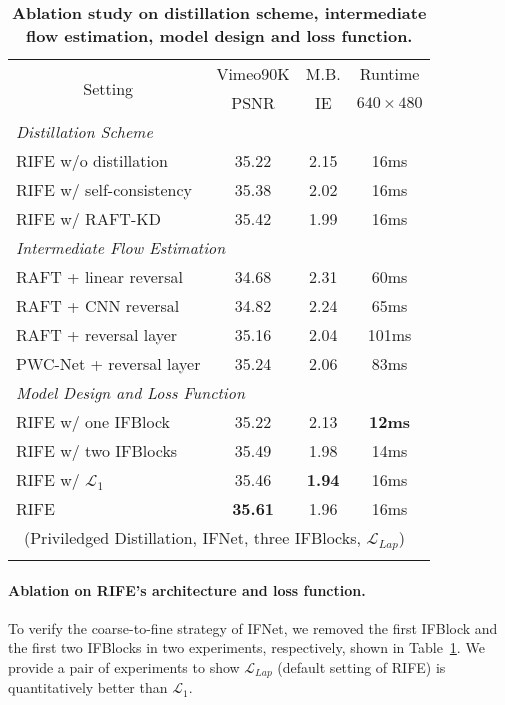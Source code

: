 \documentclass[final]{cvpr}
\def\red#1{\textcolor{MyRed}{#1}}
\def\first#1{\red{\textbf{#1}}}
\begin{document}
\begin{table}[t]
	\caption{\textbf{Ablation study on distillation scheme, intermediate flow estimation, model design and loss function.}}
	\small
	\begin{tabular}{lccc}
		\hline
		\multicolumn{1}{c}{\multirow{2}{*}{Setting}} & \multicolumn{1}{c}{Vimeo90K} & \multicolumn{1}{c}{M.B.} & \multicolumn{1}{c}{Runtime} \\ 
		\multicolumn{1}{c}{}                         & \multicolumn{1}{c}{PSNR}   & \multicolumn{1}{c}{IE}     & \multicolumn{1}{c}{$640\times 480$}            \\ \hline 
		\multicolumn{4}{l}{\emph{Distillation Scheme}}\\
		RIFE w/o distillation & 35.22 & 2.15 & 16ms\\
		RIFE w/ self-consistency & 35.38 & 2.02 & 16ms\\
		RIFE w/ RAFT-KD & {35.42} & {1.99} & 16ms\\ \hline
\multicolumn{4}{l}{\emph{Intermediate Flow Estimation}}\\
		RAFT + linear reversal & 34.68 & 2.31 & {60ms} \\
		RAFT + CNN reversal &  34.82 & 2.24 & 65ms \\
		RAFT + reversal layer &  35.16 & {2.04} & 101ms \\
		PWC-Net + reversal layer &  {35.24} & 2.06 & 83ms \\ \hline
\multicolumn{4}{l}{\emph{Model Design and Loss Function}}\\
		RIFE w/ one IFBlock & 35.22 & 2.13 & \first{12ms}\\ 
		RIFE w/ two IFBlocks & {35.49} & {1.98} & 14ms\\ 
		RIFE w/ $\mathcal{L}_1$ & {35.46} & \first{1.94} & 16ms \\
\hline \hline
		RIFE& \first{35.61} & {1.96} & 16ms \\
		\multicolumn{4}{l}{~(Priviledged Distillation, IFNet, three IFBlocks, $\mathcal{L}_{Lap}$)}\\
		\hline 
		\normalsize
	\end{tabular}
\label{tab:ablation2}
\end{table}

\paragraph{Ablation on RIFE's architecture and loss function.}To verify the coarse-to-fine strategy of IFNet, we removed the first IFBlock and the first two IFBlocks in two experiments, respectively, shown in Table~\ref{tab:ablation2}. We provide a pair of experiments to show $\mathcal{L}_{Lap}$ (default setting of RIFE) is quantitatively better than $\mathcal{L}_1$. 
\end{document}
